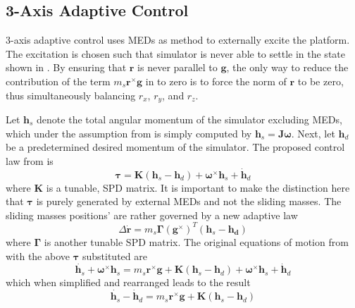 \subsection{3-Axis Adaptive Control}\label{sec:3_axis_adaptive}
3-axis adaptive control uses MEDs as method to externally excite the platform. The excitation is chosen such that simulator is never able to settle in the state shown in . By ensuring that $\bm{r}$ is never parallel to $\bm{g}$, the only way to reduce the contribution of the term $m_s\bm{r}^{\times}\bm{g}$ in  to zero is to force the norm of $\bm{r}$ to be zero, thus simultaneously balancing $r_x$, $r_y$, and $r_z$. 

Let $\bm{h}_s$ denote the total angular momentum of the simulator excluding MEDs, which under the assumption from  is simply computed by $\bm{h}_s=\bm{J\omega}$. Next, let $\bm{h}_d$ be a predetermined desired momentum of the simulator. The proposed control law from \cite{kim_automatic_2009} is
\begin{equation}
    \bm{\tau}=\bm{K}(\bm{h}_s-\bm{h}_d)+\bm{\omega}^{\times}\bm{h}_s+\dot{\bm{h}}_d
\end{equation}
where $\bm{K}$ is a tunable, SPD matrix. It is important to make the distinction here that $\bm{\tau}$ is purely generated by external MEDs and not the sliding masses. The sliding masses positions' are rather governed by a new adaptive law
\begin{equation}\label{equation:3_axis_adaptive_law}
    \Delta\dot{\bm{r}}=m_s\bm{\Gamma}(\bm{g}^{\times})^T(\bm{h}_s-\bm{h_d})
\end{equation}
where $\bm{\Gamma}$ is another tunable SPD matrix. The original equations of motion from  with the above $\bm{\tau}$ substituted are
\begin{equation}
    \dot{\bm{h}_s}+\bm{\omega}^{\times}\bm{h}_s=m_s\bm{r}^{\times}\bm{g}+
    \bm{K}(\bm{h}_s-\bm{h}_d)+\bm{\omega}^{\times}\bm{h}_s+\dot{\bm{h}}_d
\end{equation}
which when simplified and rearranged leads to the result
\begin{equation}\label{equation:h_dot_result}
    \dot{\bm{h}_s}-\dot{\bm{h}}_d=m_s\bm{r}^{\times}\bm{g}+
    \bm{K}(\bm{h}_s-\bm{h}_d)
\end{equation}

